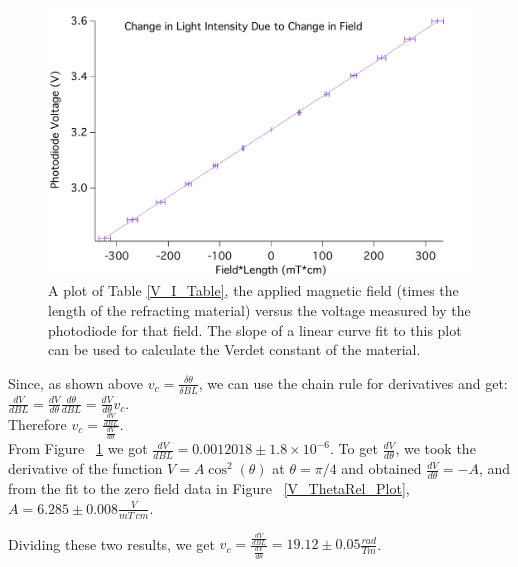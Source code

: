 \documentclass[prb,preprint]{revtex4-1}
\begin{document}
\begin{figure}[h!]
\centering
\includegraphics[width=5in]{V_B-L_Plot.pdf}
\caption{A plot of Table \ref{V_I_Table}, the applied magnetic field (times the length of the refracting material) versus the voltage measured by the photodiode for that field. The slope of a linear curve fit to this plot can be used to calculate the Verdet constant of the material. }
\label{V_B*L_Plot}
\end{figure}

Since, as shown above $v_c = \frac{\delta \theta}{\delta BL}$, we can use the chain rule for derivatives and get: 
\\
$\frac{ dV}{ dBL} = \frac{dV}{d\theta} \frac{d\theta}{dBL} = \frac{dV}{d\theta} v_c$.  
\\
Therefore $v_c = \frac{\frac{dV}{dBL}}{\frac{dV}{d\theta}}$.
\\
From Figure ~\ref{V_B*L_Plot} we got $\frac{dV}{dBL} = 0.0012018 \pm 1.8 \times 10^{-6}$. To get $\frac{dV}{d\theta}$, we took the derivative of the function $V = A \cos^{2}(\theta)$ at $\theta = \pi/4$ and obtained $\frac{dV}{d\theta} = -A$, and from the fit to the zero field data in Figure ~\ref{V_ThetaRel_Plot}, $A = 6.285 \pm 0.008 \frac{V}{mT\ cm}$.  

Dividing these two results, we get $v_c = \frac{\frac{dV}{dBL}}{\frac{dV}{d\theta}} = 19.12 \pm 0.05 \frac{rad}{Tm}$.  

\end{document}
